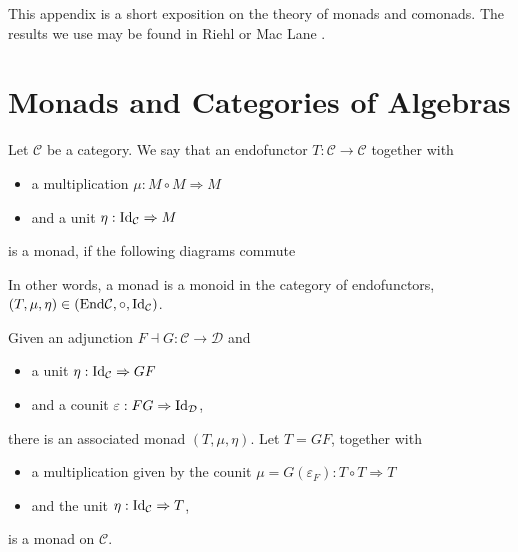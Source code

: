 \documentclass[../thesis.tex]{subfiles}
\begin{document}
    This appendix is a short exposition on the theory of monads and comonads. The results we use may be found in Riehl \cite{Riehl16} or Mac Lane \cite{MacLane71}. 
    \section{Monads and Categories of Algebras}
        \begin{definition}[Monad]
            Let $\mathcal{C}$ be a category. We say that an endofunctor $T : \mathcal{C} \rightarrow \mathcal{C}$ together with
            \begin{itemize}
                \item a multiplication $\mu : M\circ M \Rightarrow M$
                \item and a unit $\eta : \tt{Id}_{\mathcal{C}} \Rightarrow M$
            \end{itemize}
            is a monad, if the following diagrams commute
            \begin{center}
            \end{center}
        \end{definition}
        In other words, a monad is a monoid in the category of endofunctors, $(T, \mu, \eta) \in (\tt{End}\mathcal{C}, \circ, \tt{Id}_\mathcal{C})$.

        \begin{lemma}
            Given an adjunction $F \dashv G : \mathcal{C} \rightarrow \mathcal{D}$ and
            \begin{itemize}
                \item a unit $\eta : \tt{Id}_\mathcal{C} \Rightarrow GF$
                \item and a counit $\varepsilon : FG \Rightarrow \tt{Id}_\mathcal{D}$,
            \end{itemize} 
            there is an associated monad $(T, \mu, \eta)$. Let $T = GF$, together with
            \begin{itemize}
                \item a multiplication given by the counit $\mu = G(\varepsilon_F) : T\circ T \Rightarrow T$
                \item and the unit $\eta : \tt{Id}_\mathcal{C} \Rightarrow T$,
            \end{itemize}
            is a monad on $\mathcal{C}$.
        \end{lemma}
\end{document}
